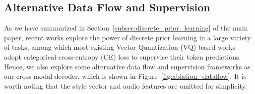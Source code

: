\begin{table}[!t]
\centering
\setlength\tabcolsep{7pt}
\caption{
Comparison of lip-sync errors. We compare different methods on BIWI-Test-A. Lower means better. $\lambda$ is the weighting factor.
}\vspace{-0.5em}
{
  }
  \label{tab:dataflow}
  \vspace{-2mm}
\end{table}


\subsection{Alternative Data Flow and Supervision}
As we have summarized in Section~\ref{subsec:discrete_prior_learning} of the main paper, recent works explore the power of discrete prior learning in a large variety of tasks, among which most existing Vector Quantization (VQ)-based works~\cite{ng2022learning,zhou2022towards} adopt categorical cross-entropy (CE) loss to supervise their token predictions. Hence, we also explore some alternative data flow and supervision frameworks as our cross-modal decoder, which is shown in Figure~\ref{fig:ablation_dataflow}. It is worth noting that the style vector and audio features are omitted for simplicity.


